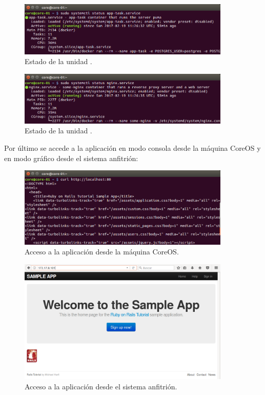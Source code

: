 \begin{figure}[H]
\centering
\includegraphics[width=0.9\textwidth]{images/figures/app-task.service.png}
\caption{Estado de la unidad .\label{fig:figure_placement_example}}
\end{figure}

\begin{figure}[H]
\centering
\includegraphics[width=0.9\textwidth]{images/figures/nginx.service.png}
\caption{Estado de la unidad .\label{fig:figure_placement_example}}
\end{figure}

Por último se accede a la aplicación en modo consola desde la máquina CoreOS y en modo gráfico desde el sistema anfitrión:

\begin{figure}[H]
\centering
\includegraphics[width=0.9\textwidth]{images/figures/coreosmanualcurl.png}
\caption{Acceso a la aplicación desde la máquina CoreOS.\label{fig:figure_placement_example}}
\end{figure}

\begin{figure}[H]
\centering
\includegraphics[width=0.9\textwidth]{images/figures/coreosmanualhost.png}
\caption{Acceso a la aplicación desde el sistema anfitrión.\label{fig:figure_placement_example}}
\end{figure}

